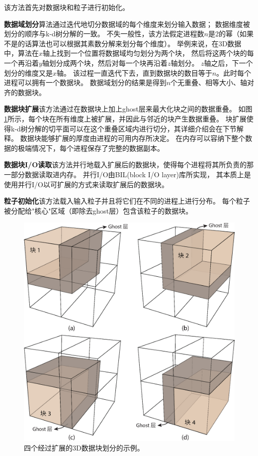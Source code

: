 该方法首先对数据块和粒子进行初始化。

{\bf 数据域划分}\quad 算法通过迭代地切分数据域的每个维度来划分输入数据；
数据维度被划分的顺序与k-d树分解的一致。
不失一般性，该方法假定进程数$n$是2的幂（如果不是的话算法也可以根据其素数分解来划分每个维度）。
举例来说，在3D数据中，算法在$x$轴上找到一个位置将数据域均匀划分为两个块，
然后将这两个块的每一个再沿着$y$轴划分成两个块，然后对每一个块再沿着$z$轴划分。
$z$轴之后，下一个划分的维度又是$x$轴。
该过程一直迭代下去，直到数据块的数目等于$n$。此时每个进程可以拥有一个数据块。 数据域划分的结果是得到$n$个无重叠、相等大小、轴对齐的数据块。

{\bf 数据块扩展}\quad 该方法通过在数据块上加上ghost层来最大化块之间的数据重叠。
如图\ref{fig:kdtree:ghost}所示，每个块在所有维度上被扩展，并因此与邻近的块产生数据重叠。
块扩展使得k-d树分解的切平面可以在这个重叠区域内进行切分，其详细介绍会在下节解释。
数据块能够扩展的厚度由进程的可用内存所决定。
在内存可以容纳下整个数据的极端情况下，每个进程保存了完整的数据副本。

{\bf 数据块I/O读取}\quad 该方法并行地载入扩展后的数据块，使得每个进程将其所负责的那一部分数据读取进内存。
并行I/O由BIL(block I/O layer)\parencite{KendallHPLR11}库所实现，
其本质上是使用并行I/O以可扩展的方式来读取扩展后的数据块。

{\bf 粒子初始化}\quad 该方法载入输入粒子并且将它们在不同的进程上进行分布。
每个粒子被分配给"核心"区域（即除去ghost层）包含该粒子的数据块。
\begin{figure}[!tb]
  \centering
  \includegraphics[width=0.6\linewidth]{image/loadbalance/ghost}
  \caption{四个经过扩展的3D数据块划分的示例\parencite{ZhangGHYP18}。}
  \label{fig:kdtree:ghost}
\end{figure}

